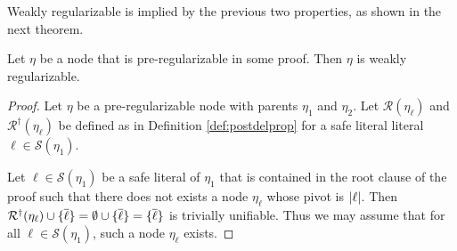 Weakly regularizable is implied by the previous two properties, as shown in the next theorem.

\begin{thm}
Let $\eta$ be a node that is pre-regularizable in some proof. Then $\eta$ is weakly regularizable.
\end{thm}

\begin{proof}

Let $\eta$ be a pre-regularizable node with parents $\eta_1$ and $\eta_2$. Let $\mathcal{R}(\eta_\ell)$ and $\mathcal{R}^\dagger(\eta_\ell)$ be defined as in Definition \ref{def:postdelprop} for a safe literal literal $\ell \in \mathcal{S}(\eta_1)$.

Let $\ell \in \mathcal{S}(\eta_1)$ be a safe literal of $\eta_1$ that is contained in the root clause of the proof such that there does not exists a node $\eta_\ell$ whose pivot is $\lvert\ell\rvert$. Then $\mathcal{R}^\dagger(\eta_\ell)\cup\{\overline{\ell}\}=\emptyset\cup\{\overline{\ell}\}=\{\overline{\ell}\}$ is trivially unifiable. Thus we may assume that for all $\ell\in\mathcal{S}(\eta_1)$, such a node $\eta_\ell$ exists.




\end{proof}
